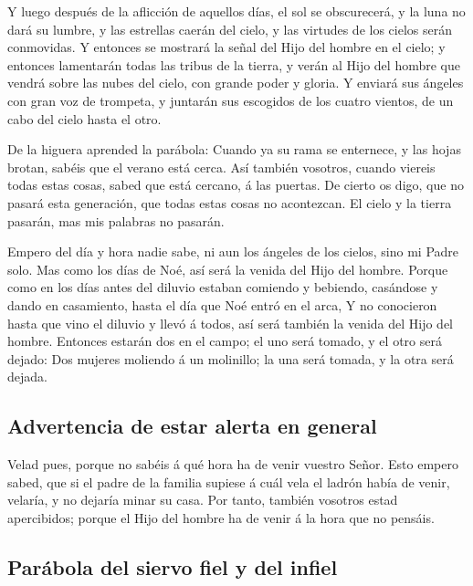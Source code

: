  Y luego después de la aflicción de aquellos días, el sol
se obscurecerá, y la luna no dará su lumbre, y las estrellas caerán del
cielo, y las virtudes de los cielos serán conmovidas.  Y
entonces se mostrará la señal del Hijo del hombre en el cielo; y
entonces lamentarán todas las tribus de la tierra, y verán al Hijo del
hombre que vendrá sobre las nubes del cielo, con grande poder y gloria.
 Y enviará sus ángeles con gran voz de trompeta, y
juntarán sus escogidos de los cuatro vientos, de un cabo del cielo hasta
el otro.

 De la higuera aprended la parábola: Cuando ya su rama se
enternece, y las hojas brotan, sabéis que el verano está cerca.
 Así también vosotros, cuando viereis todas estas cosas,
sabed que está cercano, á las puertas.  De cierto os
digo, que no pasará esta generación, que todas estas cosas no
acontezcan.  El cielo y la tierra pasarán, mas mis
palabras no pasarán.

 Empero del día y hora nadie sabe, ni aun los ángeles de
los cielos, sino mi Padre solo.  Mas como los días de
Noé, así será la venida del Hijo del hombre.  Porque como
en los días antes del diluvio estaban comiendo y bebiendo, casándose y
dando en casamiento, hasta el día que Noé entró en el arca,
 Y no conocieron hasta que vino el diluvio y llevó á
todos, así será también la venida del Hijo del hombre. 
Entonces estarán dos en el campo; el uno será tomado, y el otro será
dejado:  Dos mujeres moliendo á un molinillo; la una será
tomada, y la otra será dejada.

\hypertarget{advertencia-de-estar-alerta-en-general}{%
\subsection{Advertencia de estar alerta en
general}\label{advertencia-de-estar-alerta-en-general}}

 Velad pues, porque no sabéis á qué hora ha de venir
vuestro Señor.  Esto empero sabed, que si el padre de la
familia supiese á cuál vela el ladrón había de venir, velaría, y no
dejaría minar su casa.  Por tanto, también vosotros estad
apercibidos; porque el Hijo del hombre ha de venir á la hora que no
pensáis.

\hypertarget{paruxe1bola-del-siervo-fiel-y-del-infiel}{%
\subsection{Parábola del siervo fiel y del
infiel}\label{paruxe1bola-del-siervo-fiel-y-del-infiel}}

